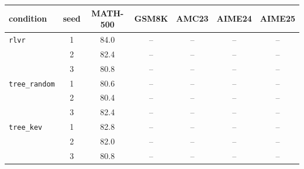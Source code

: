 \begin{tabular}{@{}lcccccc@{}}
\toprule
condition & seed & MATH-500 & GSM8K & AMC23 & AIME24 & AIME25 \\ \midrule
\texttt{rlvr} & 1 & 84.0 & -- & -- & -- & -- \\
 & 2 & 82.4 & -- & -- & -- & -- \\
 & 3 & 80.8 & -- & -- & -- & -- \\
\addlinespace
\texttt{tree\_random} & 1 & 80.6 & -- & -- & -- & -- \\
 & 2 & 80.4 & -- & -- & -- & -- \\
 & 3 & 82.4 & -- & -- & -- & -- \\
\addlinespace
\texttt{tree\_kev} & 1 & 82.8 & -- & -- & -- & -- \\
 & 2 & 82.0 & -- & -- & -- & -- \\
 & 3 & 80.8 & -- & -- & -- & -- \\
\bottomrule
\end{tabular}
